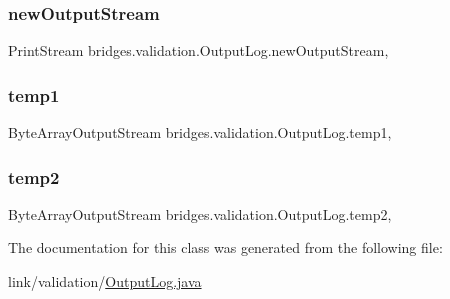\hypertarget{classbridges_1_1validation_1_1_output_log_acf8b19de1738e70f12eba5854b9e01b4}{}\label{classbridges_1_1validation_1_1_output_log_acf8b19de1738e70f12eba5854b9e01b4} 
\subsubsection{\texorpdfstring{new\+Output\+Stream}{newOutputStream}}
{\footnotesize\ttfamily Print\+Stream bridges.\+validation.\+Output\+Log.\+new\+Output\+Stream\hspace{0.3cm}{\ttfamily [static]}, {\ttfamily [protected]}}

\hypertarget{classbridges_1_1validation_1_1_output_log_a142611812dd1ea095c4a1274bd40a93a}{}\label{classbridges_1_1validation_1_1_output_log_a142611812dd1ea095c4a1274bd40a93a} 
\subsubsection{\texorpdfstring{temp1}{temp1}}
{\footnotesize\ttfamily Byte\+Array\+Output\+Stream bridges.\+validation.\+Output\+Log.\+temp1\hspace{0.3cm}{\ttfamily [static]}, {\ttfamily [protected]}}

\hypertarget{classbridges_1_1validation_1_1_output_log_ab1f0ab7e9ada60f29c4c4f59694c1163}{}\label{classbridges_1_1validation_1_1_output_log_ab1f0ab7e9ada60f29c4c4f59694c1163} 
\subsubsection{\texorpdfstring{temp2}{temp2}}
{\footnotesize\ttfamily Byte\+Array\+Output\+Stream bridges.\+validation.\+Output\+Log.\+temp2\hspace{0.3cm}{\ttfamily [static]}, {\ttfamily [protected]}}



The documentation for this class was generated from the following file\+:\begin{DoxyCompactItemize}
\item 
link/validation/\hyperlink{_output_log_8java}{Output\+Log.\+java}\end{DoxyCompactItemize}
